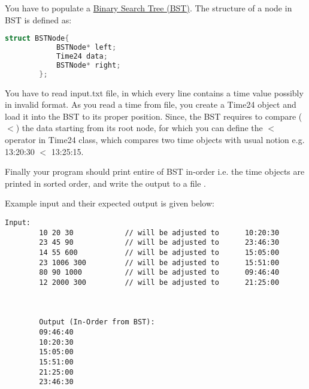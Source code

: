 \documentclass[a4paper,12pt]{article}
\begin{document}
You have to populate a \href{https://www.programiz.com/dsa/binary-search-tree}{Binary Search Tree (BST)}. The structure of a node in BST is defined as: 
	
	  \begin{lstlisting}[frame=single,language=c++]
		struct BSTNode{
			BSTNode* left;
			Time24 data;
			BSTNode* right;
		};
	\end{lstlisting}

	You have to read input.txt file, in which every line contains a time value possibly in invalid format. As you read a time from file, you create a Time24 object and load it into the BST to its proper position. Since, the BST requires to compare ($ < $) the data starting from its root node, for which you can define the $ < $ operator in Time24 class, which compares two time objects with usual notion e.g. 13:20:30 $ < $ 13:25:15. 
	
	Finally your program should print entire of BST in-order i.e. the time objects are printed in sorted order, and write the output to a file .
	
	Example input and their expected output is given below:
	
	\begin{lstlisting}[frame=single]
		Input:
		10 20 30			// will be adjusted to 		10:20:30
		23 45 90			// will be adjusted to 		23:46:30
		14 55 600			// will be adjusted to		15:05:00
		23 1006 300			// will be adjusted to		15:51:00
		80 90 1000			// will be adjusted to		09:46:40
		12 2000 300			// will be adjusted to		21:25:00
		
		
		
		Output (In-Order from BST):
		09:46:40
		10:20:30
		15:05:00
		15:51:00
		21:25:00
		23:46:30
	\end{lstlisting}
	
\end{document}
